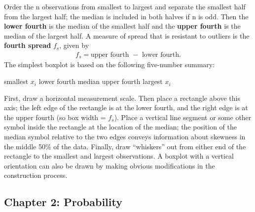 \documentclass{report}
\begin{document}
Order the n observations from smallest to largest and separate the smallest half
from the largest half; the median is included in both halves if n is odd. Then
the \textbf{lower fourth} is the median of the smallest half and the \textbf{upper fourth} is
the median of the largest half. A measure of spread that is resistant to outliers
is the \textbf{fourth spread} $f_{s}$, given by
\begin{align*}
    f_{s} = \text{upper fourth } - \text{ lower fourth}
.\end{align*}
\bigbreak \noindent 
The simplest boxplot is based on the following five-number summary:
\bigbreak \noindent 
\begin{center}
    smallest $x_{i}$ \quad lower fourth \quad median \quad upper fourth \quad largest $x_{i}$ 
\end{center}
\bigbreak \noindent 
First, draw a horizontal measurement scale. Then place a rectangle above this axis;
the left edge of the rectangle is at the lower fourth, and the right edge is at the upper
fourth (so box width = $f_{s}$). Place a vertical line segment or some other symbol
inside the rectangle at the location of the median; the position of the median symbol
relative to the two edges conveys information about skewness in the middle 50\% of
the data. Finally, draw “whiskers” out from either end of the rectangle to the smallest and largest observations. A boxplot with a vertical orientation can also be drawn
by making obvious modifications in the construction process.
\bigbreak \noindent 
{}

    \pagebreak 
    \subsection{Chapter 2: Probability}
    \bigbreak \noindent 
\end{document}
